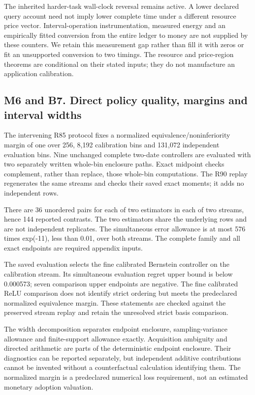 The inherited harder-task wall-clock reversal remains active. A lower
declared query account need not imply lower complete time under a
different resource price vector. Interval-operation instrumentation,
measured energy and an empirically fitted conversion from the entire
ledger to money are not supplied by these counters. We retain this
measurement gap rather than fill it with zeros or fit an unsupported
conversion to two timings. The resource and price-region theorems are
conditional on their stated inputs; they do not manufacture an
application calibration.

\hypertarget{m6-and-b7.-direct-policy-quality-margins-and-interval-widths}{%
\subsection{M6 and B7. Direct policy quality, margins and interval
widths}\label{m6-and-b7.-direct-policy-quality-margins-and-interval-widths}}

The intervening R85 protocol fixes a normalized
equivalence/noninferiority margin of one over 256, 8,192 calibration
bins and 131,072 independent evaluation bins. Nine unchanged complete
two-date controllers are evaluated with two separately written whole-bin
enclosure paths. Exact midpoint checks complement, rather than replace,
those whole-bin computations. The R90 replay regenerates the same
streams and checks their saved exact moments; it adds no independent
rows.

There are 36 unordered pairs for each of two estimators in each of two
streams, hence 144 reported contrasts. The two estimators share the
underlying rows and are not independent replicates. The simultaneous
error allowance is at most 576 times exp(-11), less than 0.01, over both
streams. The complete family and all exact endpoints are required
appendix inputs.

The saved evaluation selects the fine calibrated Bernstein controller on
the calibration stream. Its simultaneous evaluation regret upper bound
is below 0.000573; seven comparison upper endpoints are negative. The
fine calibrated ReLU comparison does not identify strict ordering but
meets the predeclared normalized equivalence margin. These statements
are checked against the preserved stream replay and retain the
unresolved strict basis comparison.

The width decomposition separates endpoint enclosure, sampling-variance
allowance and finite-support allowance exactly. Acquisition ambiguity
and directed arithmetic are parts of the deterministic endpoint
enclosure. Their diagnostics can be reported separately, but independent
additive contributions cannot be invented without a counterfactual
calculation identifying them. The normalized margin is a predeclared
numerical loss requirement, not an estimated monetary adoption
valuation.

